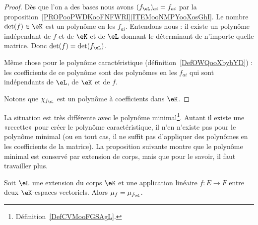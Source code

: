 \begin{proof}
	Dès que l'on a des bases nous avons \( (f_{\eL})_{ai}=f_{ai}\) par la proposition~\ref{PROPooPWDKooFNFWRI}\ref{ITEMooNMPYooXosGhI}. Le nombre \( \det(f)\in \eK\) est un polynôme en les \( f_{ai}\). Entendons nous : il existe un polynôme indépendant de \( f\) et de \( \eK\) et de \( \eL\) donnant le déterminant de n'importe quelle matrice. Donc \( \det(f)=\det(f_{\eL})\).

	Même chose pour le polynôme caractéristique (définition~\ref{DefOWQooXbybYD}) : les coefficients de ce polynôme sont des polynômes en les \( f_{ai}\) qui sont indépendants de \( \eL\), de \( \eK\) et de \( f\).

	Notons que \( \chi_{f_{\eL}}\) est un polynôme à coefficients dans \( \eK\).
\end{proof}

La situation est très différente avec le polynôme minimal\footnote{Définition~\ref{DefCVMooFGSAgL}.}. Autant il existe une «recette» pour créer le polynôme caractéristique, il n'en n'existe pas pour le polynôme minimal (ou en tout cas, il ne suffit pas d'appliquer des polynômes en les coefficients de la matrice). La proposition suivante montre que le polynôme minimal est conservé par extension de corps, mais que pour le savoir, il faut travailler plus.

\begin{proposition}      \label{PROPooXVZMooXcJrsJ}
	Soit \( \eL\) une extension du corps \( \eK\) et une application linéaire \( f\colon E\to F\) entre deux \( \eK\)-espaces vectoriels. Alors \( \mu_f=\mu_{f_{\eL}}\).
\end{proposition}

